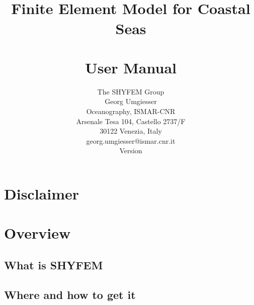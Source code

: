 \documentclass{report}
\title{%
	\shy{}
	\\Finite Element Model for Coastal Seas
	\\~
	\\User Manual
	}
\author{%
	The SHYFEM Group
	\\Georg Umgiesser
	\\Oceanography, ISMAR-CNR
	\\Arsenale Tesa 104, Castello 2737/F
	\\30122 Venezia, Italy
	\vspace{0.5cm}
	\\georg.umgiesser@ismar.cnr.it
	\vspace{1cm}
	\\Version \VERSION
	}
\begin{document}


\pagestyle{plain}

\maketitle


\thispagestyle{empty}

\newpage
\tableofcontents
\newpage


\chapter*{Disclaimer}

	

\newpage
{}



\chapter{Overview}

	\section{What is SHYFEM}
	

	\section{Where and how to get it}
	


\end{document}
